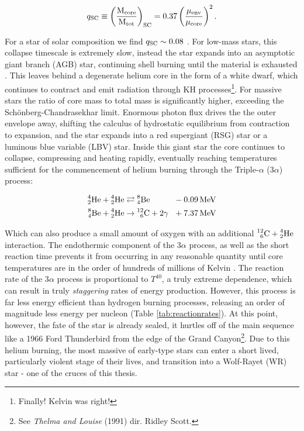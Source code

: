 \begin{equation}
  q\rms{SC} \equiv \left(\frac{\mass\rms{core}}{\mass\rms{tot}}\right)\rms{SC} = 0.37 \left(\frac{\mu\rms{env}}{\mu\rms{core}}\right)^2 .
\end{equation}

\noindent
For a star of solar composition we find $q\rms{SC} \sim 0.08$
\parencite[Ch.~5]{salarisEvolutionStarsStellar2005}.
For low-mass stars, this collapse timescale is extremely slow, instead the star expands into an asymptotic giant branch (AGB) star, continuing shell burning until the material is exhausted
\parencite{beechSchoenbergChandrasekharLimitPolytropic1988}.
This leaves behind a degenerate helium core in the form of a white dwarf, which continues to contract and emit radiation through KH processes\footnote{Finally! Kelvin was right!}.
For massive stars the ratio of core mass to total mass is significantly higher, exceeding the Sch{\"o}nberg-Chandrasekhar limit.
Enormous photon flux drives the the outer envelope away, shifting the calculus of hydrostatic equilibrium from contraction to expansion, and the star expands into a red supergiant (RSG) star or a luminous blue variable (LBV) star.
Inside this giant star the core continues to collapse, compressing and heating rapidly, eventually reaching temperatures sufficient for the commencement of helium burning through the Triple-$\alpha$ (3$\alpha$) process:

\begin{equation}
  \begin{alignedat}{3}
    \atom{He}{4}{2} + \atom{He}{4}{2} & \rightleftarrows \atom{Be}{8}{4} && ~~ - \SI{0.09}{\mega\electronvolt} \\
    \atom{Be}{8}{4} + \atom{He}{4}{2} & \rightarrow \atom{C}{12}{6} + 2\gamma && ~~ + \SI{7.37}{\mega\electronvolt} 
  \end{alignedat}
\end{equation}

\noindent
Which can also produce a small amount of oxygen with an additional $\atom{C}{12}{6} + \atom{He}{4}{2}$ interaction.
The endothermic component of the 3$\alpha$ process, as well as the short reaction time prevents it from occurring in any reasonable quantity until core temperatures are in the order of hundreds of millions of Kelvin
\parencite[Pt.~6]{kippenhahnStellarStructureEvolution2012}.
The reaction rate of the 3$\alpha$ process is proportional to $T^{40}$, a truly extreme dependence, which can result in truly \emph{staggering} rates of energy production.
However, this process is far less energy efficient than hydrogen burning processes, releasing an order of magnitude less energy per nucleon (Table \ref{tab:reactionrates}).
At this point, however, the fate of the star is already sealed, it hurtles off of the main sequence like a 1966 Ford Thunderbird from the edge of the Grand Canyon\footnote{See \emph{Thelma and Louise} (1991) dir. Ridley Scott.}.
Due to this helium burning, the most massive of early-type stars can enter a short lived, particularly violent stage of their lives, and transition into a Wolf-Rayet (WR) star - one of the cruces of this thesis.

